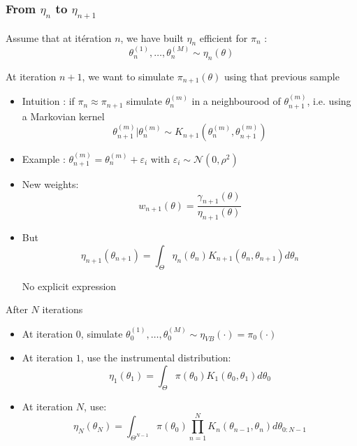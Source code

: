 \begin{frame}\frametitle{From $\eta_n$ to $\eta_{n+1}$}
 Assume that at itération $n$,  we have built  $\eta_n$ efficient for  $\pi_n$ :  $$\theta_n^{(1)}, \dots, \theta_n^{(M)} \sim \eta_n(\theta)$$ 
\vspace{1em}

At iteration  $n+1$,  we want to simulate  $\pi_{n+1}(\theta)$ using that previous sample
\begin{itemize}
\item \vert Intuition \noir: if $\pi_n \approx \pi_{n+1}$ simulate $\theta_{n}^{(m)}$ in a neighbourood of  $\theta_{n+1}^{(m)}$, i.e. using a Markovian kernel
$$ \theta_{n+1}^{(m)} | \theta_n^{(m)} \sim K_{n+1}(\theta_n^{(m)}, \theta_{n+1}^{(m)})$$
\item[] Example : $ \theta_{n+1}^{(m)} = \theta_n^{(m)} + \varepsilon_i$ with $\varepsilon_i \sim\mathcal{N}(0,\rho^2)$ 
\item  \vert New weights: \noir  $$w_{n+1}(\theta) = \frac{\gamma_{n+1}(\theta)}{\eta_{n+1}(\theta)} $$

\item \vert But \noir 
$$\eta_{n+1}(\theta_{n+1})  = \int_{\Theta}\eta_n(\theta_n) K _{n+1}(\theta_n,\theta_{n+1}) d\theta_n$$

\begin{center}
No explicit expression
\end{center}
\end{itemize}

\end{frame} 

\begin{frame}{After $N$ iterations}
\begin{itemize}
\item At iteration $0$,  simulate   $\theta_0^{(1)}, \dots, \theta_0^{(M)} \sim \eta_{VB}(\cdot) = \pi_0(\cdot)$ 
\item At iteration $1$,  use the instrumental distribution: 
$$\eta_{1}(\theta_{1})  = \int_{\Theta}\pi(\theta_0)  K_1(\theta_0,\theta_{1}) d\theta_0$$
\item At iteration $N$, use: 
$$\eta_{N}(\theta_{N})  = \int_{\Theta^{N-1}} \pi(\theta_0) \prod_{n=1}^{N}  K_n(\theta_{n-1},\theta_{n}) d\theta_{0:N-1}$$
 \end{itemize}
\end{frame}


